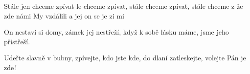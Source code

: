 \begin{TEXT}{Stále jen chceme zpívat}
\REFREN 	{}le  chceme zpívat, \NL
	stále  chceme zpívat, \NL
	stále  chceme z\NL
	že  zde  námi 
\SLOKA	My  vzdálili  \NL
	a  jej \NL
	on   se  \NL
	je zi mi 
\REFRENHRAJ

\SLOKA	On nestaví si domy,\NL
	zámek jej nestřeží,\NL
	když k sobě lásku máme,\NL
	jsme jeho přístřeší.
\REFRENHRAJ

\SLOKA	Udeřte slavně v bubny,\NL
	zpívejte, kdo jste kde,\NL
	do dlaní zatleskejte,\NL
	volejte Pán je zde\,!
\REFRENHRAJ
\end{TEXT}
